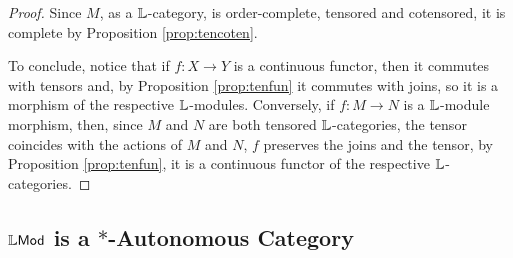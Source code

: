 \begin{proof}
Since $M$, as a $\mathbb{L}$-category, is order-complete, tensored and cotensored, it is complete by Proposition \ref{prop:tencoten}.


To conclude, notice that if $f:X\to Y$ is a continuous functor, then it commutes with tensors and, by 
Proposition \ref{prop:tenfun} it commutes with joins, so it is a morphism of the respective $\mathbb{L}$-modules. Conversely, if $f:M\to N$ is a $\mathbb{L}$-module morphism, then, since $M$ and $N$ are both tensored $\mathbb{L}$-categories, the tensor coincides with the actions of $M$ and $N$, $f$ preserves the joins and the tensor, by Proposition \ref{prop:tenfun}, it is a continuous functor of the respective $\mathbb{L}$-categories.
\end{proof}


\subsection{$\mathbb{L}\mathsf{Mod}$ is a $*$-Autonomous Category}

